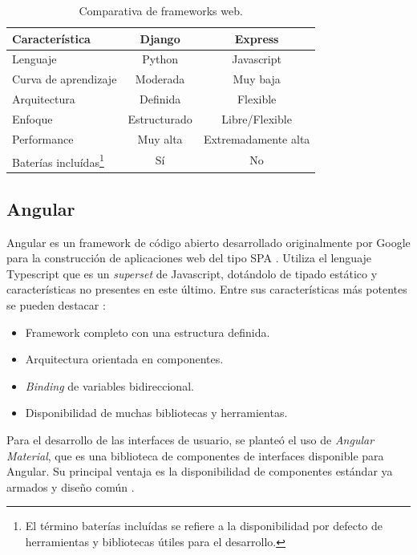 \begin{table}[H]
	\centering
	\caption[Comparativa de frameworks web.]{Comparativa de frameworks web.}
	\begin{tabular}{l c c}    
		\toprule
		\textbf{Característica} 	 & \textbf{Django} & \textbf{Express} \\
		\midrule
		Lenguaje & Python & Javascript \\		
		Curva de aprendizaje & Moderada & Muy baja			\\		
		Arquitectura & Definida & Flexible \\
		Enfoque & Estructurado & Libre/Flexible		\\
		Performance & Muy alta & Extremadamente alta \\
		Baterías incluídas\footnote{El término baterías incluídas se refiere a la disponibilidad por defecto de herramientas y bibliotecas útiles para el desarrollo.} & Sí & No \\
		\bottomrule
		\hline
	\end{tabular}
	\label{tab:comparativa-backend}
\end{table}

\subsection{Angular}

Angular es un framework de código abierto desarrollado originalmente por Google para la construcción de aplicaciones web del tipo SPA \citep{ANGULAR:1}. Utiliza el lenguaje Typescript que es un \textit{superset} de Javascript, dotándolo de tipado estático y características no presentes en este último. Entre sus características más potentes se pueden destacar \citep{ANGULAR:2}:
\begin{itemize}
	\item Framework completo con una estructura definida.
	\item Arquitectura orientada en componentes.
	\item \textit{Binding} de variables bidireccional.
	\item Disponibilidad de muchas bibliotecas y herramientas.
\end{itemize}

Para el desarrollo de las interfaces de usuario, se planteó el uso de \textit{Angular Material}, que es una biblioteca de componentes de interfaces disponible para Angular. Su principal ventaja es la disponibilidad de componentes estándar ya armados y diseño común \citep{ANGULAR:3}.

